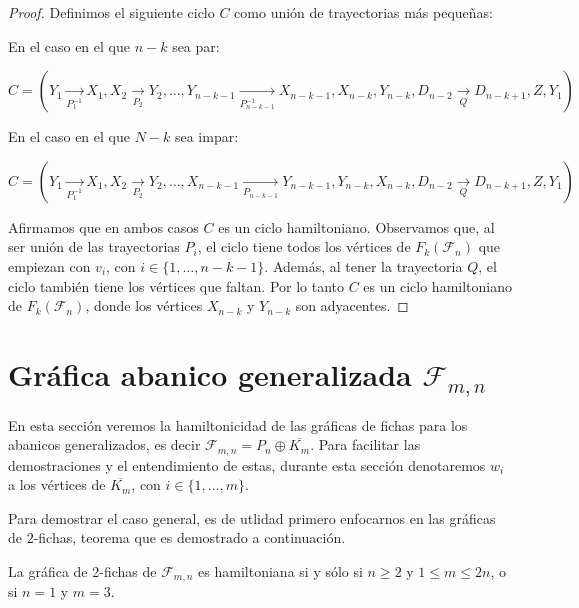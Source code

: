 \begin{proof}
            Definimos el siguiente ciclo $C$ como uni\'on de trayectorias m\'as
            peque\~{n}as: 
    
            En el caso en el que $n-k$ sea par:
            
            $C =(Y_1 \xrightarrow[P_1^{-1}]{} X_1, X_2 \xrightarrow[P_2]{} Y_2,
            \dots, Y_{n-k-1} \xrightarrow[P_{n-k-1}^{-1}]{} X_{n-k-1}, X_{n-k},
            Y_{n-k}, D_{n-2} \xrightarrow[Q]{} D_{n-k+1}, Z, Y_1)$
    
            En el caso en el que $N-k$ sea impar:
    
            $C = (Y_1 \xrightarrow[P_1^{-1}]{} X_1, X_2 \xrightarrow[P_2]{} Y_2,
            \dots, X_{n-k-1} \xrightarrow[P_{n-k-1}]{} Y_{n-k-1}, Y_{n-k},
            X_{n-k}, D_{n-2} \xrightarrow[Q]{} D_{n-k+1}, Z, Y_1)$
    
            Afirmamos que en ambos casos $C$ es un ciclo hamiltoniano.
            Observamos que, al ser uni\'on de las trayectorias $P_i$, el ciclo
            tiene todos los v\'ertices de $F_k(\mathcal{F}_n)$ que empiezan con $v_i$, con
            $i \in \{1, \dots, n-k-1\}$. Adem\'as, al tener la trayectoria $Q$,
            el ciclo tambi\'en tiene los v\'ertices que faltan. Por lo tanto $C$
            es un ciclo hamiltoniano de $F_k(\mathcal{F}_n)$, donde los v\'ertices
            $X_{n-k}$ y $Y_{n-k}$ son adyacentes. 
    
        \end{proof}

\section{Gr\'afica abanico generalizada
\texorpdfstring{$\mathcal{F}_{m,n}$}{Fmn}}%
\label{sec:GeneralFan}

En esta secci\'on veremos la hamiltonicidad de las gr\'aficas de fichas para los
abanicos generalizados, es decir $\mathcal{F}_{m,n}=P_n \oplus \overline{K_m}$.
Para facilitar las demostraciones y el entendimiento de estas, durante esta
secci\'on denotaremos $w_i$ a los v\'ertices de $\overline{K_m}$, con $i \in
\{1, \dots, m\}$. 

Para demostrar el caso general, es de utlidad primero enfocarnos en las
gr\'aficas de $2$-fichas, teorema que es demostrado a continuaci\'on.

\begin{teorema}
\label{teo:2-TokGenerFan}
    La gr\'afica de 2-fichas de $\mathcal{F}_{m,n}$ es hamiltoniana si y s\'olo si $n \geq
    2$ y $1 \leq m \leq 2n$, o si $n=1$ y $m=3$.
\end{teorema}

